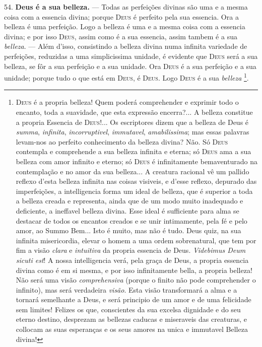  54. \textbf{Deus é a sua belleza.} --- Todas as perfeições divinas são uma e a mesma coisa com a essencia divina; porque \textsc{Deus} é perfeito pela sua essencia. Ora a belleza é uma perfeição. Logo a belleza é uma e a mesma coisa com a essencia divina; e por isso \textsc{Deus}, assim como é a sua essencia, assim tambem é a sua \emph{belleza}. --- Além d'isso, consistindo a belleza divina numa infinita variedade de perfeições, reduzidas a uma simplicissima unidade, é evidente que \textsc{Deus} será a sua belleza, se fôr a sua perfeição e a sua unidade. Ora \textsc{Deus} é a sua perfeição e a sua unidade; porque tudo o que está em \textsc{Deus}, é \textsc{Deus}. Logo \textsc{Deus} é a sua \emph{belleza} \footnote{\textsc{Deus} é a propria belleza! Quem poderá comprehender e exprimir todo o encanto, toda a suavidade, que esta expressão encerra?... A belleza constitue a propria Essencia de \textsc{Deus}!... Os escriptores dizem que a belleza de Deus é \emph{summa}, \emph{infinita}, \emph{incorruptivel}, \emph{immutavel}, \emph{amabilissima}; mas essas palavras levam-nos ao perfeito conhecimento da belleza divina? Não. Só \textsc{Deus} contempla e comprehende a sua belleza infinita e eterna; só \textsc{Deus} ama a sua belleza com amor infinito e eterno; só \textsc{Deus} é infinitamente bemaventurado na contemplação e no amor da sua belleza... A creatura racional vê um pallido reflexo d'esta belleza infinita nas coisas visiveis, e d'esse reflexo, depurado das imperfeições, a intelligencia forma um ideal de belleza, que é superior a toda a belleza creada e representa, ainda que de um modo muito inadequado e deficiente, a ineffavel belleza divina. Esse ideal é sufficiente para alma se destacar de todos os encantos creados e se unir intimamente, pela fé e pelo amor, ao Summo Bem... Isto é muito, mas não é tudo. Deus quiz, na sua infinita misericordia, elevar o homem a uma ordem sobrenatural, que tem por fim a visão \emph{clara} e \emph{intuitiva} da propria essencia de Deus. \emph{Videbimus Deum sicuti est}! A nossa intelligencia verá, pela graça de Deus, a propria essencia divina como é em si mesma, e por isso infinitamente bella, a propria belleza! Não será uma visão \emph{comprehensiva} (porque o finito não pode comprehender o infinito), mas será verdadeira \emph{visão}. Esta visão transformará a alma e a tornará semelhante a Deus, e será principio de um amor e de uma felicidade sem limites! Felizes os que, conscientes da sua excelsa dignidade e do seu eterno destino, desprezam as bellezas caducas e miseraveis das creaturas, e collocam as suas esperanças e os seus amores na unica e immutavel Belleza divina!}.


